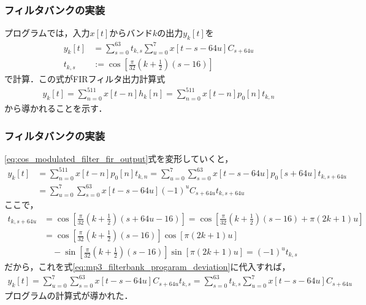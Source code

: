 \documentclass[14pt,xcolor=dvipsnames,table,dvipdfmx]{beamer}
\begin{document}
\begin{frame}[c]
    \frametitle{フィルタバンクの実装}
    プログラムでは，入力$x[t]$からバンド$k$の出力$y_{k}[t]$を
    \begin{align*}
        y_{k}[t] &= \sum_{s = 0}^{63} t_{k,s} \sum_{u = 0}^{7} x[t - s - 64u] C_{s + 64u} \\
        t_{k,s} &:= \cos\left[ \frac{\pi}{32}\left( k + \frac{1}{2} \right) \left( s - 16 \right) \right]
    \end{align*}
    で計算．この式がFIRフィルタ出力計算式
    \begin{align}
        y_{k}[t] = \sum_{n = 0}^{511} x[t - n] h_{k}[n] = \sum_{n = 0}^{511} x[t - n] p_{0}[n]  t_{k, n} \label{eq:cos_modulated_filter_fir_output}
    \end{align}
    から導かれることを示す．
\end{frame}

\begin{frame}[c]
    \frametitle{フィルタバンクの実装}
    \scriptsize
    \eqref{eq:cos_modulated_filter_fir_output}式を変形していくと，
    \begin{align}
        y_{k}[t] &= \sum_{n = 0}^{511} x[t - n] p_{0}[n] t_{k, n} = \sum_{u = 0}^{7} \sum_{s = 0}^{63} x[t - s - 64u] p_{0}[s + 64u] t_{k,s+64u} \nonumber \\
        &= \sum_{u = 0}^{7} \sum_{s = 0}^{63} x[t - s - 64u] (-1)^{u} C_{s + 64u} t_{k,s+64u} \label{eq:mp3_filterbank_progaram_deviation}
    \end{align}
    ここで，
    \begin{align*}
        t_{k,s+64u} &= \cos\left[ \frac{\pi}{32} \left( k + \frac{1}{2} \right) (s + 64u - 16) \right] = \cos\left[ \frac{\pi}{32} \left( k + \frac{1}{2} \right) (s - 16) + \pi \left( 2k + 1 \right) u \right] \\
        &= \cos\left[ \frac{\pi}{32} \left( k + \frac{1}{2} \right) (s - 16) \right]\cos\left[ \pi(2k + 1)u \right] \\
        &\quad - \sin\left[ \frac{\pi}{32} \left( k + \frac{1}{2} \right) (s - 16) \right]\sin\left[ \pi(2k + 1)u \right]
        = (-1)^{u} t_{k,s}
    \end{align*}
    だから，これを式\eqref{eq:mp3_filterbank_progaram_deviation}に代入すれば，
    \begin{align*}
        y_{k}[t] = \sum_{u = 0}^{7} \sum_{s = 0}^{63} x[t - s - 64u] C_{s + 64u} t_{k,s} = \sum_{s = 0}^{63} t_{k,s} \sum_{u = 0}^{7} x[t - s - 64u] C_{s + 64u}
    \end{align*}
    プログラムの計算式が導かれた．
\end{frame}
\end{document}
